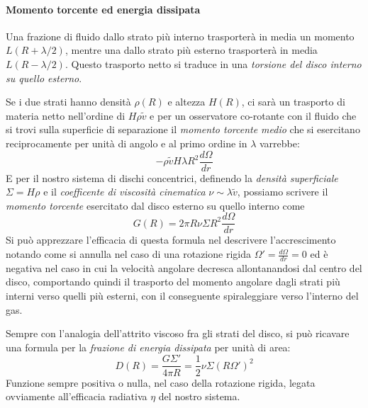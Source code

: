 \documentclass[a4paperbi]{article}
\begin{document}
	\paragraph{Momento torcente ed energia dissipata}
	Una frazione di fluido dallo strato più interno trasporterà in media un momento $L(R+\lambda/2)$, mentre una dallo strato più esterno trasporterà in media $L(R-\lambda/2)$. Questo trasporto netto si traduce in una \textit{torsione del disco interno su quello esterno}.
	
	Se i due strati hanno densità $\rho(R)$ e altezza $H(R)$, ci sarà un trasporto di materia netto nell'ordine di $H\rho\tilde{v}$ e per un osservatore co-rotante con il fluido che si trovi sulla superficie di separazione il \textit{momento torcente medio} che si esercitano reciprocamente per unità di angolo e al primo ordine in $\lambda$ varrebbe:
	\begin{equation*}
		-\rho\tilde{v} H\lambda R^2\frac{d\Omega}{dr}
	\end{equation*}
	E per il nostro sistema di dischi concentrici, definendo la \textit{densità superficiale} $\Sigma=H\rho$ e il \textit{coefficente di viscosità cinematica} $\nu\sim\lambda\tilde{v}$, possiamo scrivere il \textit{momento torcente} esercitato dal disco esterno su quello interno come
	\begin{equation}
		G(R)=2\pi R\nu\Sigma R^2\frac{d\Omega}{dr}
	\end{equation}
	Si può apprezzare l'efficacia di questa formula nel descrivere l'accrescimento notando come si annulla nel caso di una rotazione rigida $\Omega'=\frac{d\Omega}{dr}=0$ ed è negativa nel caso in cui la velocità angolare decresca allontanandosi dal centro del disco, comportando quindi il trasporto del momento angolare dagli strati più interni verso quelli più esterni, con il conseguente spiraleggiare verso l'interno del gas.
		
	Sempre con l'analogia dell'attrito viscoso fra gli strati del disco, si può ricavare una formula per la \textit{frazione di energia dissipata} per unità di area:
	\begin{equation}
		D(R)=\frac{G\Sigma'}{4\pi R}=\frac{1}{2}\nu\Sigma(R\Omega')^2
	\end{equation}
	Funzione sempre positiva o nulla, nel caso della rotazione rigida, legata ovviamente all'efficacia radiativa $\eta$ del nostro sistema.
	
\end{document}
